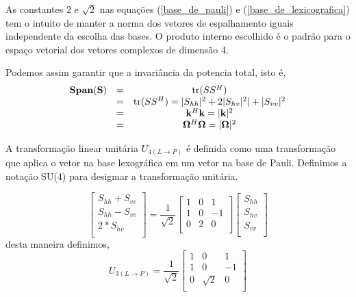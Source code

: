 As constantes $2$ e $\sqrt{2}$ nas equações (\ref{base_de_pauli}) e (\ref{base_de_lexicografica}) tem o intuito de manter a norma dos vetores de espalhamento iguais independente da escolha das bases. O produto interno escolhido é o padrão para o espaço vetorial dos vetores complexos de dimensão 4.

Podemos assim garantir que a invariância da potencia total, isto é, 
\begin{equation}\label{span_invariante}
\begin{array}{ccc}
\mathbf{Span(S)} &=& \operatorname{tr}(SS^H)\\
	   &=&  \operatorname{tr}(SS^H)=|S_{hh}|^2+2|S_{hv}|^2|+|S_{vv}|^2  \\
	   &=&  \mathbf{k}^H\mathbf{k}=|\mathbf{k}|^2\\
	   &=& \mathbf{\Omega}^H\mathbf{\Omega}=|\mathbf{\Omega}|^2
\end{array}
\end{equation}

A transformação linear unitária $U_{4(L \rightarrow P)}$ é definida como uma transformação que aplica o vetor na base lexográfica em um vetor na base de Pauli. Definimos a notação \textrm{SU(4)} para desigmar a transformação  unitária.

\begin{equation}\label{trans_matriz_unit_su3}
\left[
\begin{array}{c}
	  S_{hh} +  S_{vv}\\  
	  S_{hh} -  S_{vv}\\
	  2 * S_{hv} \\
\end{array}
\right]=\frac{1}{\sqrt{2}}	
\left[
\begin{array}{rrr}
	1   & 0 & 1  \\
	1   & 0 & -1  \\
	0   & 2 &  0  \\
\end{array}
\right]
\left[
\begin{array}{c}
	S_{hh} \\  
	S_{hv} \\
	S_{vv}\\
\end{array}
\right]
\end{equation}
desta maneira definimos,
\begin{equation}\label{matriz_unit_su3}
U_{3(L \rightarrow P)}=\frac{1}{\sqrt{2}}	
\left[
\begin{array}{rrr}
	1   & 0 & 1  \\
	1   & 0 & -1  \\
	0   & \sqrt{2} &  0  \\
\end{array}
\right]
\end{equation}
